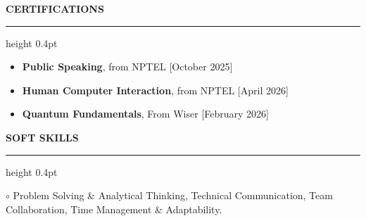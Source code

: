 \documentclass[a4paper,10pt]{article}
\newcommand{\resumesection}[1]{
    \vspace{5pt}
    {\large \bfseries \color{navy} \MakeUppercase{#1}}
    \vspace{1.5pt}
    \hrule height 0.4pt
    \vspace{3.5pt}
}
\begin{document}
\resumesection{Certifications}

\begin{itemize}
    \item \textbf{Public Speaking}, from NPTEL \hfill [October 2025]
    \item \textbf{Human Computer Interaction}, from NPTEL \hfill [April 2026]
    \item \textbf{Quantum Fundamentals}, From Wiser \hfill [February 2026]
\end{itemize}

\resumesection{Soft Skills}

\noindent
\small
$\circ$ Problem Solving \& Analytical Thinking, Technical Communication, Team Collaboration, Time Management \& Adaptability.
\end{document}
